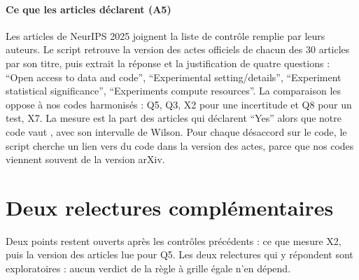 \paragraph{Ce que les articles déclarent (A5)}
Les articles de NeurIPS 2025 joignent la liste de contrôle remplie par leurs auteurs. Le script
 retrouve la version des actes officiels de chacun des 30 articles par son
titre, puis extrait la réponse et la justification de quatre questions : \enquote{Open access to data
and code}, \enquote{Experimental setting/details}, \enquote{Experiment statistical significance},
\enquote{Experiments compute resources}. La comparaison les oppose à nos codes
harmonisés : Q5, Q3, X2 pour une incertitude et Q8 pour un test, X7. La mesure est la part des articles
qui déclarent \enquote{Yes} alors que notre code vaut , avec son intervalle de Wilson. Pour
chaque désaccord sur le code, le script cherche un lien vers du code dans la version des actes, parce
que nos codes viennent souvent de la version arXiv.

\section{Deux relectures complémentaires}\label{sec:sm-relectures}

Deux points restent ouverts après les contrôles précédents : ce que mesure X2, puis la version des
articles lue pour Q5. Les deux relectures qui y répondent sont exploratoires : aucun verdict de la
règle à grille égale n'en dépend.

